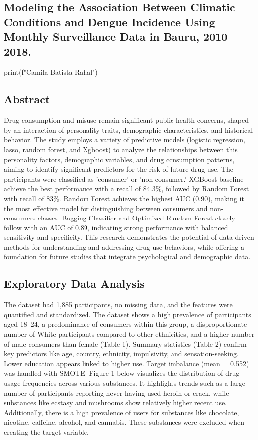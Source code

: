 \documentclass{article}
\begin{document}
\begin{center}
\section*{Modeling the Association Between Climatic Conditions and Dengue Incidence Using Monthly Surveillance Data in Bauru, 2010–2018.}

\begin{pycode}
print(f"Camila Batista Rahal")
\end{pycode}
\end{center}

\subsection*{Abstract}
Drug consumption and misuse remain significant public health concerns, shaped by an interaction of personality traits, demographic characteristics, and historical behavior. The study employs a variety of predictive models (logistic regression, lasso, random forest, and Xgboost) to analyze the relationships between this personality factors, demographic variables, and drug consumption patterns, aiming to identify significant predictors for the risk of future drug use. The participants were classified as 'consumer' or 'non-consumer.' XGBoost baseline achieve the best performance with a recall of 84.3\%, followed by Random Forest with recall of 83\%. Random Forest achieves the highest AUC (0.90), making it the most effective model for distinguishing between consumers and non-consumers classes. Bagging Classifier and Optimized Random Forest closely follow with an AUC of 0.89, indicating strong performance with balanced sensitivity and specificity. This research demonstrates the potential of data-driven methods for understanding and addressing drug use behaviors, while offering a foundation for future studies that integrate psychological and demographic data.



\subsection*{Exploratory Data Analysis}
The dataset had 1,885 participants, no missing data, and the features were quantified and standardized. The dataset shows a high prevalence of participants aged 18–24, a predominance of consumers within this group, a disproportionate number of White participants compared to other ethnicities, and a higher number of male consumers than female (Table 1). Summary statistics (Table 2) confirm key predictors like age, country, ethnicity, impulsivity, and sensation-seeking. Lower education appears linked to higher use. Target imbalance (mean = 0.552) was handled with SMOTE. Figure 1 below visualizes the distribution of drug usage frequencies across various substances. It highlights trends such as a large number of participants reporting never having used heroin or crack, while substances like ecstasy and mushrooms show relatively higher recent use. Additionally, there is a high prevalence of users for substances like chocolate, nicotine, caffeine, alcohol, and cannabis. These substances were excluded when creating the target variable.
\end{document}
